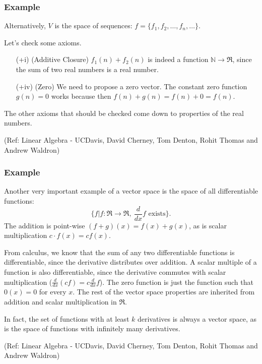 \begin{frame}[fragile]
\frametitle{Example}

\begin{example}

Alternatively, $V$ is the space of sequences: $f = \{f_1, f_2, \ldots, f_n, \ldots \}$.

Let's check some axioms.

\begin{itemize}
\item[(+i)] (Additive Closure) $f_1(n) +f_2(n)$ is indeed a function $\mathbb{N} \rightarrow \Re$, since the sum of two real numbers is a real number.

\item[(+iv)] (Zero) We need to propose a zero vector.  The constant zero function $g(n) = 0$ works because then $f(n) + g(n) = f(n) + 0 = f(n)$.
\end{itemize}

The other axioms that should be checked come down to properties of the real numbers.
\end{example}

\tiny{(Ref: Linear Algebra - UCDavis, David Cherney, Tom Denton, Rohit Thomas and Andrew Waldron)}

\end{frame}

\begin{frame}[fragile]
\frametitle{Example}
\begin{example}
Another very important example of a vector space is the space of all differentiable functions: 
\[
\{f | f:\Re\rightarrow \Re,\ \frac{d}{dx}f \text{ exists} \}.
\]
The addition is point-wise $(f+g)(x)=f(x)+g(x)$, as is scalar multiplication $c\cdot f(x)=cf(x)$.  

From calculus, we know that the sum of any two differentiable functions is differentiable, since the derivative distributes over addition.  A scalar multiple of a function is also differentiable, since the derivative commutes with scalar multiplication ($\frac{d}{d x}(cf)=c\frac{d}{dx}f$).  The zero function is just the function such that $0(x)=0$ for every $x$.  The rest of the vector space properties are inherited from addition and scalar multiplication in $\Re$.

In fact, the set of functions with at least $k$ derivatives is always a vector space, as is the space of functions with infinitely many derivatives.
\end{example}

\tiny{(Ref: Linear Algebra - UCDavis, David Cherney, Tom Denton, Rohit Thomas and Andrew Waldron)}


\end{frame}

